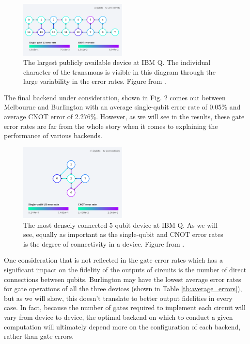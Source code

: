 \begin{figure}[h]
  \centering \includegraphics[width=0.48\textwidth]{images/connection_diagram_melbourne.png}
  \caption{The largest publicly available device at IBM Q. The individual
    character of the transmons is visible in this diagram through the large
    variability in the error rates. Figure from \cite{ibmq_16_melbourne}.}
  \label{fig:melbourne_connections}
\end{figure}

The final backend under consideration, shown in Fig.
\ref{fig:yorktown_connections} comes out between Melbourne and Burlington with
an average single-qubit error rate of 0.05\% and average CNOT error of 2.276\%.
However, as we will see in the results, these gate error rates are far from the
whole story when it comes to explaining the performance of various backends.

\begin{figure}[h]
  \centering \includegraphics[width=0.48\textwidth]{images/connection_diagram_ibmqx2.png}
  \caption{The most densely connected 5-qubit device at IBM Q. As we will see,
    equally as important as the single-qubit and CNOT error rates is the degree
    of connectivity in a device. Figure from \cite{ibmq_yorktown}.}
  \label{fig:yorktown_connections}
\end{figure}

One consideration that is not reflected in the gate error rates which has a
significant impact on the fidelity of the outputs of circuits is the number of direct
connections between qubits. Burlington may have the lowest average error rates
for gate operations of all the three devices (shown in Table
\ref{tb:average_errors}), but as we will show, this doesn't translate to better
output fidelities in every case. In fact, because the number of gates required
to implement each circuit will vary from device to device, the optimal backend
on which to conduct a given computation will ultimately depend more on the
configuration of each backend, rather than gate errors.

